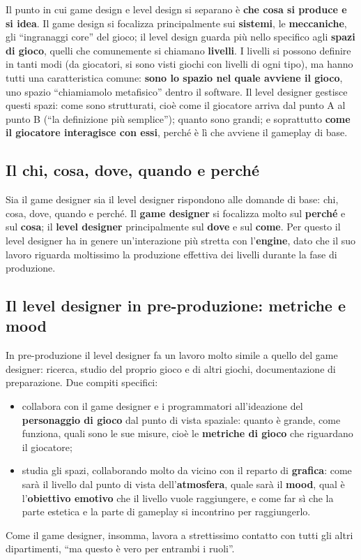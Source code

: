 Il punto in cui game design e level design si separano è \textbf{che cosa si
produce e si idea}. Il game design si focalizza principalmente sui
\textbf{sistemi}, le \textbf{meccaniche}, gli ``ingranaggi core'' del gioco;
il level design guarda più nello specifico agli \textbf{spazi di gioco},
quelli che comunemente si chiamano \textbf{livelli}. I livelli si possono
definire in tanti modi (da giocatori, si sono visti giochi con livelli di
ogni tipo), ma hanno tutti una caratteristica comune: \textbf{sono lo spazio
nel quale avviene il gioco}, uno spazio ``chiamiamolo metafisico'' dentro il
software. Il level designer gestisce questi spazi: come sono strutturati,
cioè come il giocatore arriva dal punto A al punto B (``la definizione più
semplice''); quanto sono grandi; e soprattutto \textbf{come il giocatore
interagisce con essi}, perché è lì che avviene il gameplay di base.

\subsection{Il chi, cosa, dove, quando e perché}

Sia il game designer sia il level designer rispondono alle domande di base:
chi, cosa, dove, quando e perché. Il \textbf{game designer} si focalizza
molto sul \textbf{perché} e sul \textbf{cosa}; il \textbf{level designer}
principalmente sul \textbf{dove} e sul \textbf{come}. Per questo il level
designer ha in genere un'interazione più stretta con l'\textbf{engine}, dato
che il suo lavoro riguarda moltissimo la produzione effettiva dei livelli
durante la fase di produzione.

\subsection{Il level designer in pre-produzione: metriche e mood}

In pre-produzione il level designer fa un lavoro molto simile a quello del
game designer: ricerca, studio del proprio gioco e di altri giochi,
documentazione di preparazione. Due compiti specifici:
\begin{itemize}
  \item collabora con il game designer e i programmatori all'ideazione del
        \textbf{personaggio di gioco} dal punto di vista spaziale: quanto è
        grande, come funziona, quali sono le sue misure, cioè le
        \textbf{metriche di gioco} che riguardano il giocatore;
  \item studia gli spazi, collaborando molto da vicino con il reparto di
        \textbf{grafica}: come sarà il livello dal punto di vista
        dell'\textbf{atmosfera}, quale sarà il \textbf{mood}, qual è
        l'\textbf{obiettivo emotivo} che il livello vuole raggiungere, e
        come far sì che la parte estetica e la parte di gameplay si
        incontrino per raggiungerlo.
\end{itemize}
Come il game designer, insomma, lavora a strettissimo contatto con tutti
gli altri dipartimenti, ``ma questo è vero per entrambi i ruoli''.

